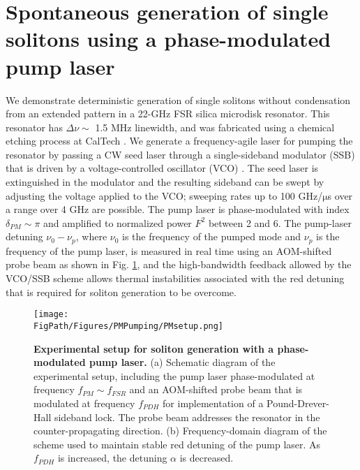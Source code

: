 \section{Spontaneous generation of single solitons using a phase-modulated pump laser}


We demonstrate deterministic generation of single solitons without condensation from an extended pattern in a 22-GHz FSR silica microdisk resonator. This resonator has $\Delta\nu\sim$ 1.5 MHz linewidth, and was fabricated using a chemical etching process at CalTech \cite{Lee2012}. We generate a frequency-agile laser for pumping the resonator by passing a CW seed laser through a single-sideband modulator (SSB) that is driven by a voltage-controlled oscillator (VCO) \cite{Stone2017}. The seed laser is extinguished in the modulator and the resulting sideband can be swept by adjusting the voltage applied to the VCO; sweeping rates up to 100 GHz/$\mathrm{\mu}$s over a range over 4 GHz are possible. The pump laser is phase-modulated with index $\delta_{PM}\sim\pi$ and amplified to normalized power $F^2$ between 2 and 6. The pump-laser detuning $\nu_0-\nu_{p}$, where $\nu_0$ is the frequency of the pumped mode and $\nu_p$ is the frequency of the pump laser, is measured in real time using an AOM-shifted probe beam as shown in Fig. \ref{fig:PMsetup}, and the high-bandwidth feedback allowed by the VCO/SSB scheme allows thermal instabilities associated with the red detuning that is required for soliton generation to be overcome. 

\begin{figure}[htpb]
	\begin{center}
		\texttt{[image: \\FigPath/Figures/PMPumping/PMsetup.png]}
	\end{center}
	\caption[Experimental setup for soliton generation with a phase-modulated pump laser]{\textbf{Experimental setup for soliton generation with a phase-modulated pump laser.} (a) Schematic diagram of the experimental setup, including the pump laser phase-modulated at frequency $f_{PM}\sim f_{FSR}$ and an AOM-shifted probe beam that is modulated at frequency $f_{PDH}$ for implementation of a Pound-Drever-Hall sideband lock. The probe beam addresses the resonator in the counter-propagating direction. (b) Frequency-domain diagram of the scheme used to maintain stable red detuning of the pump laser. As $f_{PDH}$ is increased, the detuning $\alpha$ is decreased.}
	\label{fig:PMsetup}
\end{figure} 


